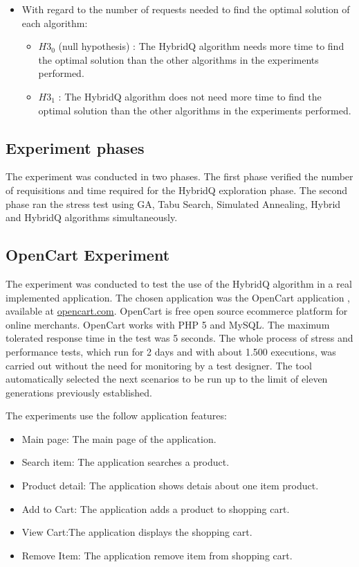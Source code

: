 \documentclass[espaco=umemeio,chapter=TITLE,twoside,openright]{abnt}
\begin{document}
\begin{itemize}
\item With regard to the number of requests needed to find the optimal solution of each algorithm:
\begin{itemize}
\item $H3_{0}$ (null hypothesis) : The HybridQ algorithm needs more time to find the optimal solution than the other algorithms in the experiments performed.
\item $H3_{1}$  : The HybridQ algorithm does not need more time to find the optimal solution than the other algorithms in the experiments performed.
\end{itemize}
\end{itemize}

\subsection{Experiment phases}

The experiment was conducted in two phases. The first phase verified the number of requisitions and time required for the HybridQ exploration phase. The second phase ran the stress test using GA, Tabu Search, Simulated Annealing, Hybrid and HybridQ algorithms simultaneously.

\subsection{OpenCart Experiment}

The experiment was conducted to test the use of the HybridQ algorithm in a real implemented application.  The chosen application was the OpenCart application , available at \url{opencart.com}. OpenCart is free open source ecommerce platform for online merchants. OpenCart works with PHP 5 and MySQL. The maximum tolerated response time in the test was 5 seconds. The whole process of stress and performance tests, which run for 2 days and  with about 1.500 executions, was carried out without the need for monitoring by a test designer. The tool automatically selected the next scenarios to be run up to the limit of eleven generations previously established. 

The experiments use the follow application features:

\begin{itemize}
\item Main page: The main page of the application.
\item Search item: The application searches a product.
\item Product detail: The application shows  detais about one item product.
\item Add to Cart: The application adds a product to shopping cart.
\item View Cart:The application displays the shopping cart.
\item Remove Item: The application remove item from shopping cart. 
\end{itemize}
\end{document}
